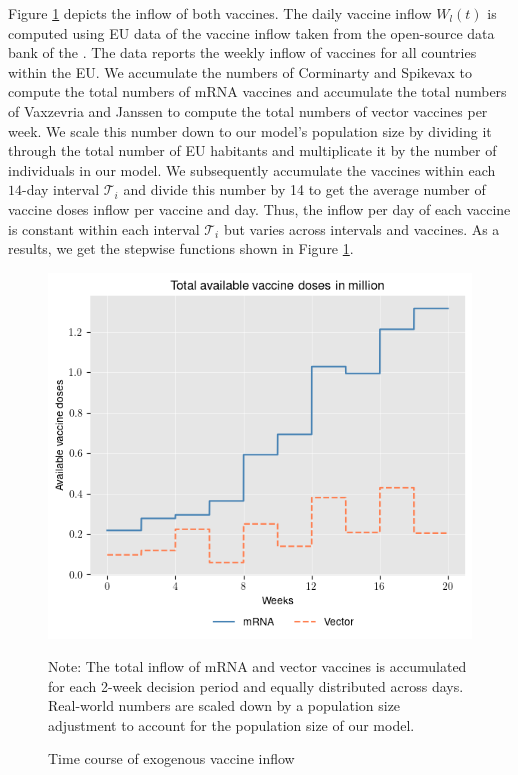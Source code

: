 Figure \ref{fig:available_vaccine} depicts the inflow of both vaccines. The daily vaccine inflow $W_l(t)$ is computed using EU data of the vaccine inflow taken from the open-source data bank of the \cite{ECDC.2021}. The data reports the weekly inflow of vaccines for all countries within the EU. We accumulate the numbers of Corminarty and Spikevax to compute the total numbers of mRNA vaccines and accumulate the total numbers of Vaxzevria and Janssen to compute the total numbers of vector vaccines per week. We scale this number down to our model's population size by dividing it through the total number of EU habitants and multiplicate it by the number of individuals in our model. We subsequently accumulate the vaccines within each $14$-day interval $\mathcal{T}_i$ and divide this number by 14 to get the average number of vaccine doses inflow per vaccine and day. Thus, the inflow per day of each vaccine is constant within each interval $\mathcal{T}_i$ but varies across intervals and vaccines. As a results, we get the stepwise functions shown in Figure \ref{fig:available_vaccine}. 
\begin{figure}[h!]
\centering
\includegraphics[scale=0.6]{images/available_vaccine.png}
\begin{flushleft}
\scriptsize{Note:} The total inflow of mRNA and vector vaccines is accumulated for each 2-week decision period and equally distributed across days. Real-world numbers are scaled down by a population size adjustment to account for the population size of our model.  
\end{flushleft}
\caption{Time course of exogenous vaccine inflow}
\label{fig:available_vaccine}
\end{figure}


